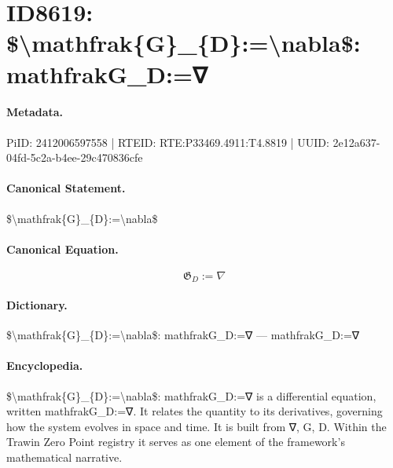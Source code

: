 \section*{ID8619: \$\textbackslash{}mathfrak\{G\}\_\{D\}:=\textbackslash{}nabla\$: mathfrakG\_D:=∇}
\paragraph{Metadata.}
PiID: 2412006597558 | RTEID: RTE:P33469.4911:T4.8819 | UUID: 2e12a637-04fd-5c2a-b4ee-29c470836cfe

\paragraph{Canonical Statement.}
\$\textbackslash{}mathfrak\{G\}\_\{D\}:=\textbackslash{}nabla\$

\paragraph{Canonical Equation.}
\[
\mathfrak{G}_{D}:=\nabla
\]

\paragraph{Dictionary.}
\$\textbackslash{}mathfrak\{G\}\_\{D\}:=\textbackslash{}nabla\$: mathfrakG\_D:=∇ — mathfrakG\_D:=∇

\paragraph{Encyclopedia.}
\$\textbackslash{}mathfrak\{G\}\_\{D\}:=\textbackslash{}nabla\$: mathfrakG\_D:=∇ is a differential equation, written mathfrakG\_D:=∇. It relates the quantity to its derivatives, governing how the system evolves in space and time. It is built from ∇, G, D. Within the Trawin Zero Point registry it serves as one element of the framework's mathematical narrative.
